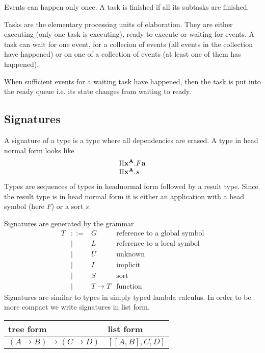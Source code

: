 Events can happen only once. A task is finished if all its subtasks are
finished.

Tasks are the elementary processing units of elaboration. They are either
executing (only one task is executing), ready to execute or waiting for events.
A task can wait for one event, for a collecion of events (all events in the
collection have happened) or on one of a collection of events (at least one of
them has happened).

When sufficient events for a waiting task have happened, then the task is put
into the ready queue i.e. its state changes from waiting to ready.





\subsection{Signatures}

A signature of a type is a type where all dependencies are erased. A type in
head normal form looks like
$$
\begin{array}{l}
    \Pi {{\mathbf x}^{{\mathbf A}}}. F {\mathbf a}
    \\
    \Pi {{\mathbf x}^{{\mathbf A}}}. s
\end{array}
$$
Types are sequences of types in headnormal form followed by a result type. Since
the result type is in head normal form it is either an application with a head
symbol (here $F$) or a sort $s$.

Signatures are generated by the grammar
$$
\begin{array}{llll}
    T
    &::=&
    G & \text{reference to a global symbol}
    \\
      &\mid&
    L & \text{reference to a local symbol}
    \\
      &\mid&
    U & \text{unknown}
    \\
      &\mid&
    I & \text{implicit}
    \\
      &\mid&
    S & \text{sort}
    \\
      &\mid&
    T \to T & \text{function}
\end{array}
$$
Signatures are similar to types in simply typed lambda calculus. In order to be
more compact we write signatures in list form.

\begin{tabular}{|l|l|}
    \hline
    tree form & list form
    \\ \hline
    $(A \to B) \to (C \to D)$ &
    $[[A,B], C, D]$
    \\
    \hline
\end{tabular}

